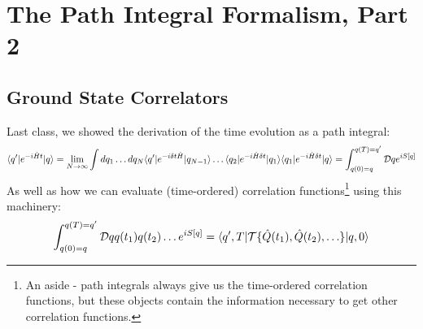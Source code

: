 \section{The Path Integral Formalism, Part 2}
\subsection{Ground State Correlators}
Last class, we showed the derivation of the time evolution as a path integral:
\begin{equation}
    \langle q' \rvert e^{-i\hat{H}t}\lvert q \rangle = \lim_{N \to \infty}\int dq_1 \ldots dq_N \langle q' \rvert e^{-i\delta t\hat{H}}\lvert q_{N-1} \rangle \ldots \langle q_2 \rvert e^{-i\hat{H}\delta t}\lvert q_1 \rangle\langle q_1 \rvert e^{-i\hat{H}\delta t}\lvert q \rangle = \int_{q(0) = q}^{q(T) = q'}\mathcal{D}q e^{iS[q]}
\end{equation}
As well as how we can evaluate (time-ordered) correlation functions\footnote{An aside - path integrals always give us the time-ordered correlation functions, but these objects contain the information necessary to get other correlation functions.} using this machinery:
\begin{equation}
    \int_{q(0) = q}^{q(T) = q'} \mathcal{D}q q(t_1)q(t_2)\ldots e^{iS[q]} = \langle q', T \rvert\mathcal{T}\{\hat{Q}(t_1), \hat{Q}(t_2), \ldots \} \lvert q, 0 \rangle
\end{equation}

